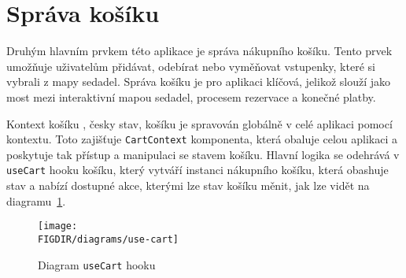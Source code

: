 \section{Správa košíku}
\label{sec:implementace-kosik}
Druhým hlavním prvkem této aplikace je správa nákupního košíku.
Tento prvek umožňuje uživatelům přidávat, odebírat nebo vyměňovat vstupenky, které si vybrali z mapy sedadel.
Správa košíku je pro aplikaci klíčová, jelikož slouží jako most mezi interaktivní mapou sedadel, procesem rezervace a konečné platby.

\begin{subsection}{Kontext košíku}
    \label{subsec:implementace-kosik-kontext}
    , česky stav, košíku je spravován globálně v celé aplikaci pomocí kontextu.
    Toto zajišťuje \texttt{CartContext} komponenta, která obaluje celou aplikaci a poskytuje tak přístup a manipulaci se stavem košíku.
    Hlavní logika se odehrává v \texttt{useCart} hooku košíku, který vytváří instanci nákupního košíku, která obashuje stav a nabízí dostupné akce, kterými lze stav košíku měnit, jak lze vidět na diagramu~\ref{fig:cart-context-diagram}.

    \begin{figure}[H]
        \centering
        \texttt{[image: \\FIGDIR/diagrams/use-cart]}
        \caption{Diagram \texttt{useCart} hooku}
        \label{fig:cart-context-diagram}
    \end{figure}
\end{subsection}

